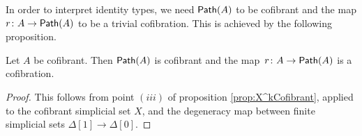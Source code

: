 \documentclass[reqno,10pt,a4paper,oneside,draft]{amsart}
\begin{document}
In order to interpret identity types, we need $\mathsf{Path}(A)$ to be cofibrant and the map $r \colon A \rightarrow \mathsf{Path}(A)$ to be a trivial cofibration. This is achieved by the following proposition.

\begin{proposition}\label{proposition:PathObjectCofibrant}
Let $A$ be cofibrant. Then $\mathsf{Path}(A)$ is cofibrant and the map~$r \colon A \rightarrow \mathsf{Path}(A)$ is a cofibration.
\end{proposition}



\begin{proof}
This follows from point $(iii)$ of proposition \ref{prop:X^kCofibrant}, applied to the cofibrant simplicial set $X$, and the degeneracy map between finite simplicial sets $\Delta[1] \rightarrow \Delta[0]$.







\end{proof}
\end{document}
